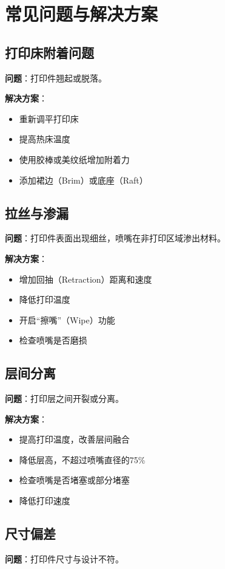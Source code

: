 \documentclass[12pt,UTF8]{ctexbook}
\begin{document}
\section{常见问题与解决方案}

\subsection{打印床附着问题}
\textbf{问题}：打印件翘起或脱落。

\textbf{解决方案}：
\begin{itemize}
\item 重新调平打印床
\item 提高热床温度
\item 使用胶棒或美纹纸增加附着力
\item 添加裙边（Brim）或底座（Raft）
\end{itemize}

\subsection{拉丝与渗漏}
\textbf{问题}：打印件表面出现细丝，喷嘴在非打印区域渗出材料。

\textbf{解决方案}：
\begin{itemize}
\item 增加回抽（Retraction）距离和速度
\item 降低打印温度
\item 开启“擦嘴”（Wipe）功能
\item 检查喷嘴是否磨损
\end{itemize}

\subsection{层间分离}
\textbf{问题}：打印层之间开裂或分离。

\textbf{解决方案}：
\begin{itemize}
\item 提高打印温度，改善层间融合
\item 降低层高，不超过喷嘴直径的75\%
\item 检查喷嘴是否堵塞或部分堵塞
\item 降低打印速度
\end{itemize}

\subsection{尺寸偏差}
\textbf{问题}：打印件尺寸与设计不符。
\end{document}
